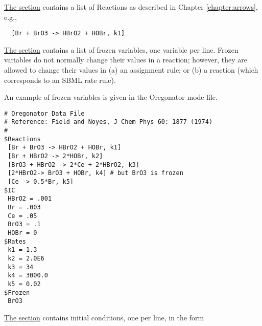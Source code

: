 \underline{The  section} contains a list of Reactions as described in Chapter \ref{chapter:arrows}, e.g., 
\begin{lstlisting}
  [Br + BrO3 -> HBrO2 + HOBr, k1]
\end{lstlisting}

\underline{The  section} contains a list of frozen variables, one variable per line. Frozen variables do not normally change their values in a reaction; however, they are allowed to change their values in (a) an assignment rule; or (b) a  reaction (which corresponds to an SBML rate rule). 


\clearpage
An example of frozen variables is given in the Oregonator mode file.
	

	
\begin{lstlisting}
# Oregonator Data File
# Reference: Field and Noyes, J Chem Phys 60: 1877 (1974)
#
$Reactions
 [Br + BrO3 -> HBrO2 + HOBr, k1] 
 [Br + HBrO2 -> 2*HOBr, k2]
 [BrO3 + HBrO2 -> 2*Ce + 2*HBrO2, k3] 
 [2*HBrO2-> BrO3 + HOBr, k4] # but BrO3 is frozen
 [Ce -> 0.5*Br, k5]
$IC
 HBrO2 = .001
 Br = .003
 Ce = .05
 BrO3 = .1
 HOBr = 0
$Rates
 k1 = 1.3
 k2 = 2.0E6
 k3 = 34
 k4 = 3000.0
 k5 = 0.02
$Frozen
 BrO3
\end{lstlisting}



\underline{The  section} contains initial conditions, one per line, in the form 


